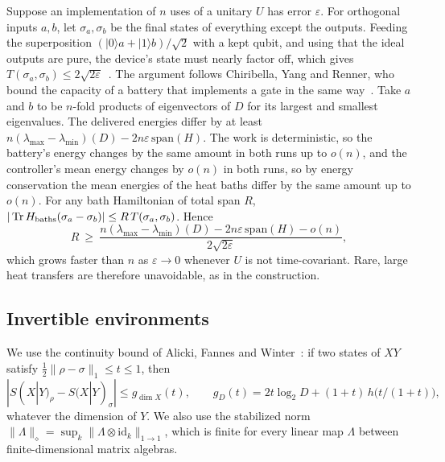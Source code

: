 Suppose an implementation of $n$ uses of a unitary $U$ has error $\varepsilon$. For orthogonal inputs $a,b$, let $\sigma_a,\sigma_b$ be the final states of everything except the outputs. Feeding the superposition $(|0\rangle a+|1\rangle b)/\sqrt2$ with a kept qubit, and using that the ideal outputs are pure, the device's state must nearly factor off, which gives $T(\sigma_a,\sigma_b)\le2\sqrt{2\varepsilon}$~\cite{KSW08}. The argument follows Chiribella, Yang and Renner, who bound the capacity of a battery that implements a gate in the same way~\cite{ChiribellaYangRenner21}. Take $a$ and $b$ to be $n$-fold products of eigenvectors of $D$ for its largest and smallest eigenvalues. The delivered energies differ by at least $n(\lambda_{\max}-\lambda_{\min})(D)-2n\varepsilon\,\mathrm{span}(H)$. The work is deterministic, so the battery's energy changes by the same amount in both runs up to $o(n)$, and the controller's mean energy changes by $o(n)$ in both runs, so by energy conservation the mean energies of the heat baths differ by the same amount up to $o(n)$. For any bath Hamiltonian of total span $R$, $|\operatorname{Tr} H_{\mathrm{baths}}(\sigma_a-\sigma_b)|\le R\,T(\sigma_a,\sigma_b)$. Hence
\[
R\ \ge\ \frac{n(\lambda_{\max}-\lambda_{\min})(D)-2n\varepsilon\,\mathrm{span}(H)-o(n)}{2\sqrt{2\varepsilon}},
\]
which grows faster than $n$ as $\varepsilon\to0$ whenever $U$ is not time-covariant. Rare, large heat transfers are therefore unavoidable, as in the construction.

\subsection{Invertible environments}\label{sw:app:invertible}

We use the continuity bound of Alicki, Fannes and Winter~\cite{Winter16}: if two states of $XY$ satisfy $\tfrac12\|\rho-\sigma\|_1\le t\le1$, then
\begin{equation}\label{sw:eq:afw}
|S(X|Y)_\rho-S(X|Y)_\sigma|\le g_{\dim X}(t),\qquad g_D(t)=2t\log_2 D+(1+t)\,h\bigl(t/(1+t)\bigr),
\end{equation}
whatever the dimension of $Y$. We also use the stabilized norm $\|\Lambda\|_\diamond=\sup_k\|\Lambda\otimes\mathrm{id}_k\|_{1\to1}$, which is finite for every linear map $\Lambda$ between finite-dimensional matrix algebras.

